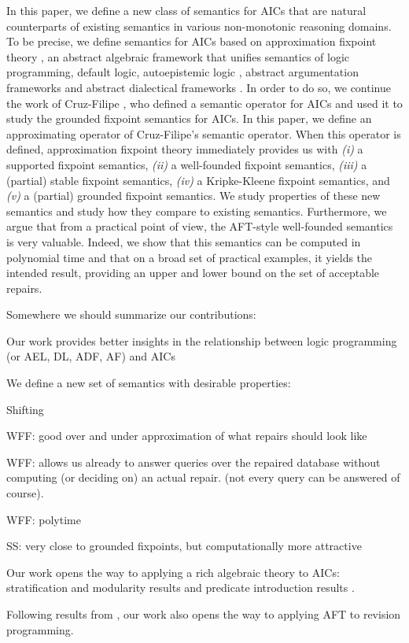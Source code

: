In this paper, we define a new class of semantics for AICs that are natural counterparts of existing semantics in  various non-monotonic reasoning domains. 
To be precise, we define semantics for AICs based on approximation fixpoint theory , an abstract algebraic framework that unifies semantics of logic programming, default logic, autoepistemic logic , abstract argumentation frameworks  and abstract dialectical frameworks . 
In order to do so, we continue the work of Cruz-Filipe \cite{iclp/Cruz-Filipe16}, who defined a semantic operator for AICs and used it to study the grounded fixpoint semantics  for AICs. 
In this paper, we define an approximating operator of Cruz-Filipe's semantic operator. 
When this operator is defined, approximation fixpoint theory immediately provides us with \textit{(i)} a supported fixpoint semantics, \textit{(ii)} a well-founded fixpoint semantics, \textit{(iii)} a (partial) stable fixpoint semantics, \textit{(iv)} a Kripke-Kleene fixpoint semantics, and \textit{(v)} a (partial) grounded fixpoint semantics. 
We study properties of these new semantics and study how they compare to existing semantics. 
Furthermore, we argue that from a practical point of view, the AFT-style well-founded semantics is very valuable. 
Indeed, we show that this semantics can be computed in polynomial time and that on a broad set of practical examples, it yields the intended result, providing an upper and lower bound on the set of acceptable repairs.  

Somewhere we should summarize our contributions:
\begin{compactitem}
 \item Our work provides better insights in the relationship between logic programming (or AEL, DL, ADF, AF) and AICs
\item We define a new set of semantics with desirable properties:
\begin{compactitem}
\item  Shifting
 \item WFF: good over and under approximation of what repairs should look like
 \item WFF: allows us already to answer queries over the repaired database without computing (or deciding on) an actual repair. (not every query can be answered of course). 
 \item WFF: polytime
 \item SS: very close to grounded fixpoints, but computationally more attractive
\end{compactitem}
\item Our work opens the way to applying a rich algebraic theory to AICs: stratification and modularity results \cite{tocl/VennekensGD06,tocl/BogaertsVD16} and predicate introduction results \cite{VennekensMWD07a,VennekensMWD07b}. 
\item Following results from \citet{tplp/CaropreseT11}, our work also opens the way to applying AFT to revision programming. 
\end{compactitem}
 
